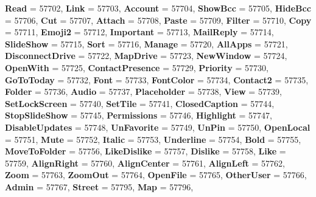 \begin{DoxyCompactItemize}
\newline
{\bfseries Read} = 57702, 
{\bfseries Link} = 57703, 
{\bfseries Account} = 57704, 
{\bfseries Show\+Bcc} = 57705, 
\newline
{\bfseries Hide\+Bcc} = 57706, 
{\bfseries Cut} = 57707, 
{\bfseries Attach} = 57708, 
{\bfseries Paste} = 57709, 
\newline
{\bfseries Filter} = 57710, 
{\bfseries Copy} = 57711, 
{\bfseries Emoji2} = 57712, 
{\bfseries Important} = 57713, 
\newline
{\bfseries Mail\+Reply} = 57714, 
{\bfseries Slide\+Show} = 57715, 
{\bfseries Sort} = 57716, 
{\bfseries Manage} = 57720, 
\newline
{\bfseries All\+Apps} = 57721, 
{\bfseries Disconnect\+Drive} = 57722, 
{\bfseries Map\+Drive} = 57723, 
{\bfseries New\+Window} = 57724, 
\newline
{\bfseries Open\+With} = 57725, 
{\bfseries Contact\+Presence} = 57729, 
{\bfseries Priority} = 57730, 
{\bfseries Go\+To\+Today} = 57732, 
\newline
{\bfseries Font} = 57733, 
{\bfseries Font\+Color} = 57734, 
{\bfseries Contact2} = 57735, 
{\bfseries Folder} = 57736, 
\newline
{\bfseries Audio} = 57737, 
{\bfseries Placeholder} = 57738, 
{\bfseries View} = 57739, 
{\bfseries Set\+Lock\+Screen} = 57740, 
\newline
{\bfseries Set\+Tile} = 57741, 
{\bfseries Closed\+Caption} = 57744, 
{\bfseries Stop\+Slide\+Show} = 57745, 
{\bfseries Permissions} = 57746, 
\newline
{\bfseries Highlight} = 57747, 
{\bfseries Disable\+Updates} = 57748, 
{\bfseries Un\+Favorite} = 57749, 
{\bfseries Un\+Pin} = 57750, 
\newline
{\bfseries Open\+Local} = 57751, 
{\bfseries Mute} = 57752, 
{\bfseries Italic} = 57753, 
{\bfseries Underline} = 57754, 
\newline
{\bfseries Bold} = 57755, 
{\bfseries Move\+To\+Folder} = 57756, 
{\bfseries Like\+Dislike} = 57757, 
{\bfseries Dislike} = 57758, 
\newline
{\bfseries Like} = 57759, 
{\bfseries Align\+Right} = 57760, 
{\bfseries Align\+Center} = 57761, 
{\bfseries Align\+Left} = 57762, 
\newline
{\bfseries Zoom} = 57763, 
{\bfseries Zoom\+Out} = 57764, 
{\bfseries Open\+File} = 57765, 
{\bfseries Other\+User} = 57766, 
\newline
{\bfseries Admin} = 57767, 
{\bfseries Street} = 57795, 
{\bfseries Map} = 57796, 

\end{DoxyCompactItemize}
